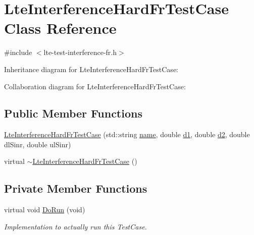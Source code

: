 \hypertarget{classLteInterferenceHardFrTestCase}{}\section{Lte\+Interference\+Hard\+Fr\+Test\+Case Class Reference}
\label{classLteInterferenceHardFrTestCase}


{\ttfamily \#include $<$lte-\/test-\/interference-\/fr.\+h$>$}



Inheritance diagram for Lte\+Interference\+Hard\+Fr\+Test\+Case\+:


Collaboration diagram for Lte\+Interference\+Hard\+Fr\+Test\+Case\+:
\subsection*{Public Member Functions}
\begin{DoxyCompactItemize}
\item 
\hyperlink{classLteInterferenceHardFrTestCase_ab9fbf56c2dcca9f6fabcefbcdf147e7e}{Lte\+Interference\+Hard\+Fr\+Test\+Case} (std\+::string \hyperlink{generate__test__data__lte__spectrum__model_8m_ab74e6bf80237ddc4109968cedc58c151}{name}, double \hyperlink{lte__uplink__power__control_8m_a6a56223849c00f2bb062c6e55d2954df}{d1}, double \hyperlink{lte__link__budget__interference__fr_8m_a479b78c01efbe4664b402a300da492f7}{d2}, double dl\+Sinr, double ul\+Sinr)
\item 
virtual \hyperlink{classLteInterferenceHardFrTestCase_a459c8056b4a07b0114ebe58d2685f1b7}{$\sim$\+Lte\+Interference\+Hard\+Fr\+Test\+Case} ()
\end{DoxyCompactItemize}
\subsection*{Private Member Functions}
\begin{DoxyCompactItemize}
\item 
virtual void \hyperlink{classLteInterferenceHardFrTestCase_a2967abd43e38abed8a9d85d51c59937b}{Do\+Run} (void)
\begin{DoxyCompactList}\small\item\em Implementation to actually run this Test\+Case. \end{DoxyCompactList}\end{DoxyCompactItemize}
